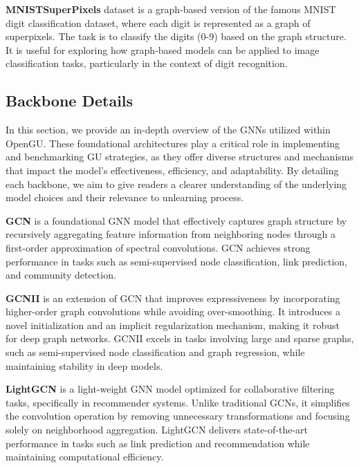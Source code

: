 \textbf{MNISTSuperPixels} \cite{MNISTSuperPixels} dataset is a graph-based version of the famous MNIST digit classification dataset, where each digit is represented as a graph of superpixels. The task is to classify the digits (0-9) based on the graph structure. It is useful for exploring how graph-based models can be applied to image classification tasks, particularly in the context of digit recognition.



\subsection{Backbone Details}
\label{A.Backbone}

In this section, we provide an in-depth overview of the GNNs utilized within OpenGU. These foundational architectures play a critical role in implementing and benchmarking GU strategies, as they offer diverse structures and mechanisms that impact the model's effectiveness, efficiency, and adaptability. By detailing each backbone, we aim to give readers a clearer understanding of the underlying model choices and their relevance to unlearning process.

\textbf{GCN} \cite{kipf2016gcn} is a foundational GNN model that effectively captures graph structure by recursively aggregating feature information from neighboring nodes through a first-order approximation of spectral convolutions. GCN achieves strong performance in tasks such as semi-supervised node classification, link prediction, and community detection. 

\textbf{GCNII} \cite{chen2020gcnii} is an extension of GCN that improves expressiveness by incorporating higher-order graph convolutions while avoiding over-smoothing. It introduces a novel initialization and an implicit regularization mechanism, making it robust for deep graph networks. GCNII excels in tasks involving large and sparse graphs, such as semi-supervised node classification and graph regression, while maintaining stability in deep models.

\textbf{LightGCN} \cite{LightGCN} is a light-weight GNN model optimized for collaborative filtering tasks, specifically in recommender systems. Unlike traditional GCNs, it simplifies the convolution operation by removing unnecessary transformations and focusing solely on neighborhood aggregation. LightGCN delivers state-of-the-art performance in tasks such as link prediction and recommendation while maintaining computational efficiency.

